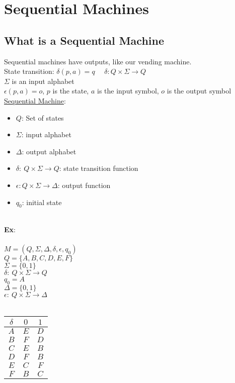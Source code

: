 \documentclass{scrartcl}
\begin{document}
\section{Sequential Machines}
\subsection{What is a Sequential Machine}
Sequential machines have outputs, like our vending machine.\\
State transition: $\delta(p,a)=q$ \ \ $\delta : Q \times \Sigma \rightarrow Q$\\
$\Sigma$ is an input alphabet\\
$\epsilon(p,a)=o$, $p$ is the state, $a$ is the input symbol, $o$ is the output symbol\\

\underline{Sequential Machine}:
\begin{itemize}
\item $Q$: Set of states
\item $\Sigma$: input alphabet
\item $\Delta$: output alphabet
\item $\delta:\ Q\times\Sigma\rightarrow Q$: state transition function
\item $\epsilon: Q\times\Sigma\rightarrow\Delta$: output function
\item $q_0$: initial state
\end{itemize}\ \\
\textbf{Ex}:\\\\
$M=(Q,\Sigma,\Delta,\delta,\epsilon,q_0)$\\
$Q=\{A,B,C,D,E,F\}$\\
$\Sigma=\{0,1\}$\\
$\delta:\ Q\times\Sigma\rightarrow Q$\\
$q_0=A$\\
$\Delta=\{0,1\}$\\
$\epsilon:\ Q\times\Sigma\rightarrow\Delta$\\\\
\begin{minipage}{0.45\linewidth}\centering
\begin{tabular} {|c|c c|}
\hline
$\delta$&$0$&$1$\\
\hline
$A$ & $E$ & $D$\\
$B$ & $F$ & $D$\\
$C$ & $E$ & $B$\\
$D$ & $F$ & $B$\\
$E$ & $C$ & $F$\\
$F$ & $B$ & $C$\\
\hline
\end{tabular}
\end{minipage}
\end{document}
